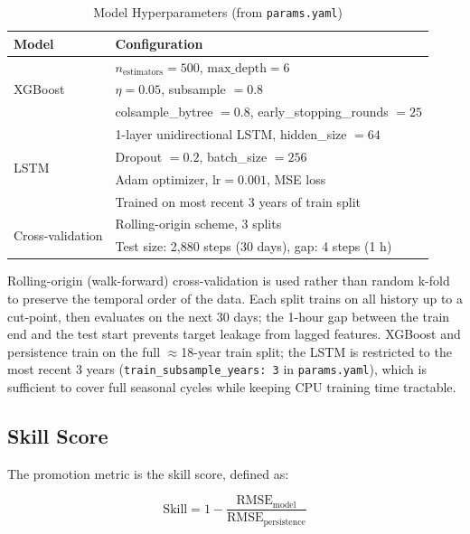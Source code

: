 \documentclass[11pt,a4paper]{article}
\begin{document}
\begin{table}[H]
\centering
\begin{tabular}{@{}ll@{}}
\toprule
\textbf{Model} & \textbf{Configuration} \\
\midrule
\multirow{3}{*}{XGBoost} & $n_{\text{estimators}} = 500$, $\text{max\_depth} = 6$ \\
                         & $\eta = 0.05$, subsample $= 0.8$ \\
                         & colsample\_bytree $= 0.8$, early\_stopping\_rounds $= 25$ \\
\midrule
\multirow{4}{*}{LSTM}    & 1-layer unidirectional LSTM, hidden\_size $= 64$ \\
                         & Dropout $= 0.2$, batch\_size $= 256$ \\
                         & Adam optimizer, $\text{lr} = 0.001$, MSE loss \\
                         & Trained on most recent 3 years of train split \\
\midrule
\multirow{2}{*}{Cross-validation} & Rolling-origin scheme, 3 splits \\
                         & Test size: 2,880 steps (30 days), gap: 4 steps (1 h) \\
\bottomrule
\end{tabular}
\caption{Model Hyperparameters (from \texttt{params.yaml})}
\label{tab:hyperparams}
\end{table}

Rolling-origin (walk-forward) cross-validation is used rather than random k-fold to preserve the temporal order of the data. Each split trains on all history up to a cut-point, then evaluates on the next 30 days; the 1-hour gap between the train end and the test start prevents target leakage from lagged features. XGBoost and persistence train on the full $\approx$18-year train split; the LSTM is restricted to the most recent 3 years (\texttt{train\_subsample\_years: 3} in \texttt{params.yaml}), which is sufficient to cover full seasonal cycles while keeping CPU training time tractable.

\subsection{Skill Score}

The promotion metric is the skill score, defined as:

\begin{equation}
\text{Skill} = 1 - \frac{\text{RMSE}_{\text{model}}}{\text{RMSE}_{\text{persistence}}}
\end{equation}
\end{document}
